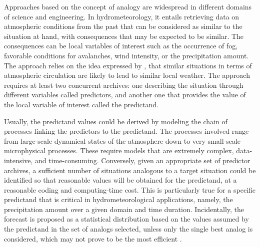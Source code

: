 \documentclass[review]{elsarticle}
\begin{document}
Approaches based on the concept of analogy are widespread in different domains of science and engineering. In hydrometeorology, it entails retrieving data on atmospheric conditions from the past that can be considered as similar to the situation at hand, with consequences that may be expected to be similar. The consequences can be local variables of interest such as the occurrence of fog, favorable conditions for avalanches, wind intensity, or the precipitation amount. The approach relies on the idea expressed by \citet{Lorenz1956, Lorenz1969}, that similar situations in terms of atmospheric circulation are likely to lead to similar local weather. The approach requires at least two concurrent archives: one describing the situation through different variables called predictors, and another one that provides the value of the local variable of interest called the predictand. 

Usually, the predictand values could be derived by modeling the chain of processes linking the predictors to the predictand. The processes involved range from large-scale dynamical states of the atmosphere down to very small-scale microphysical processes. These require models that are extremely complex, data-intensive, and time-consuming. Conversely, given an appropriate set of predictor archives, a sufficient number of situations analogous to a target situation could be identified so that reasonable values will be obtained for the predictand, at a reasonable coding and computing-time cost. This is particularly true for a specific predictand that is critical in hydrometeorological applications, namely, the precipitation amount over a given domain and time duration. Incidentally, the forecast is proposed as a statistical distribution based on the values assumed by the predictand in the set of analogs selected, unless only the single best analog is considered, which may not prove to be the most efficient \citep{Bontron2005}.
\end{document}
